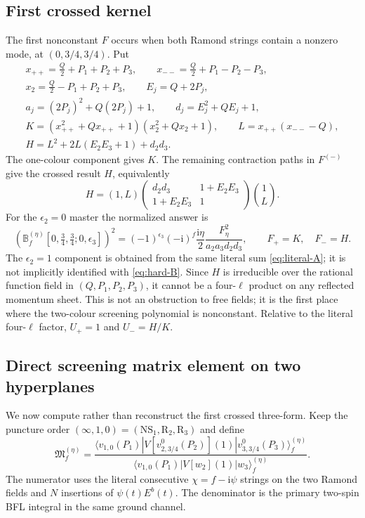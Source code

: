 \documentclass[11pt]{article}
\newcommand{\NS}{\mathrm{NS}}
\newcommand{\R}{\mathrm{R}}
\newcommand{\eps}{\epsilon}
\newcommand{\ii}{\mathrm i}
\begin{document}
\subsection{First crossed kernel}

The first nonconstant $F$ occurs when both Ramond strings contain a
nonzero mode, at $(0,3/4,3/4)$.  Put
\begin{gather}
 x_{++}=\frac Q2+P_1+P_2+P_3,\qquad
 x_{--}=\frac Q2+P_1-P_2-P_3,\\
 x_2=\frac Q2-P_1+P_2+P_3,\qquad E_j=Q+2P_j,\\
 a_j=(2P_j)^2+Q(2P_j)+1,\qquad
 d_j=E_j^2+QE_j+1,\\
 K=(x_{++}^2+Qx_{++}+1)(x_2^2+Qx_2+1),\qquad
 L=x_{++}(x_{--}-Q),\\
 H=L^2+2L(E_2E_3+1)+d_2d_3.
 \label{eq:KH}
\end{gather}
The one-colour component gives $K$.  The remaining contraction paths in
$F^{(-)}$ give the crossed result $H$, equivalently
\begin{equation}
 H=(1,L)
 \begin{pmatrix}d_2d_3&1+E_2E_3\\1+E_2E_3&1\end{pmatrix}
 \binom{1}{L}.
 \label{eq:hard-kernel}
\end{equation}
For the $\eps_2=0$ master the normalized answer is
\begin{equation}
 \left(\mathbb B_f^{(\eta)}
 [0,\tfrac34,\tfrac34;0,\eps_3]\right)^2
 =(-1)^{\eps_3}(-\ii)^f\frac{\ii\eta}{2}
 \frac{F_\eta^2}{a_2a_3d_2d_3},
 \qquad F_+=K,\quad F_-=H.
 \label{eq:hard-B}
\end{equation}
The $\eps_2=1$ component is obtained from the same literal sum
\eqref{eq:literal-A}; it is not implicitly identified with
\eqref{eq:hard-B}.
Since $H$ is irreducible over the rational function field in
$(Q,P_1,P_2,P_3)$, it cannot be a four-$\ell$ product on any reflected
momentum sheet.  This is not an obstruction to free fields; it is the first
place where the two-colour screening polynomial is nonconstant.  Relative
to the literal four-$\ell$ factor, $U_+=1$ and $U_-=H/K$.

\subsection{Direct screening matrix element on two hyperplanes}
\label{sec:direct-trial}

We now compute rather than reconstruct the first crossed three-form.  Keep
the puncture order $(\infty,1,0)=(\NS_1,\R_2,\R_3)$ and define
\begin{equation}
 \mathfrak M_f^{(\eta)}=
 \frac{
 \langle v_{1,0}(P_1)|
 V[v_{2,3/4}^{0}(P_2)](1)|v_{3,3/4}^{0}(P_3)\rangle_f^{(\eta)}
 }{
 \langle v_{1,0}(P_1)|V[w_2](1)|w_3\rangle_f^{(\eta)}}.
 \label{eq:direct-matrix-element}
\end{equation}
The numerator uses the literal consecutive $\chi=f-\ii\psi$ strings on
the two Ramond fields and $N$ insertions of
$\psi(t)E^b(t)$.  The denominator is the primary two-spin BFL integral in
the same ground channel.
\end{document}
